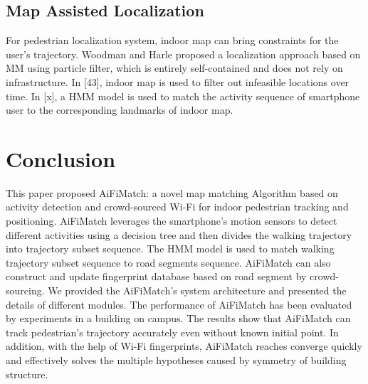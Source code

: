 \documentclass[conference]{IEEEtran}
\begin{document}
\subsection{Map Assisted Localization}
For pedestrian localization system, indoor map can bring constraints for the user's trajectory. Woodman and Harle proposed a localization approach based on MM using particle filter, which is entirely self-contained and does not rely on infrastructure. In [43], indoor map is used to filter out infeasible locations over time. In [x], a HMM model is used to match the activity sequence of smartphone user to the corresponding landmarks of indoor map.

\section{Conclusion}

This paper proposed AiFiMatch: a novel map matching Algorithm based on activity detection and crowd-sourced Wi-Fi for indoor pedestrian tracking and positioning. AiFiMatch leverages the smartphone's motion sensors to detect different activities using a decision tree and then divides the walking trajectory into trajectory subset sequence. The HMM model is used to match walking trajectory subset sequence to road segments sequence.  AiFiMatch can also construct and update fingerprint database based on road segment by crowd-sourcing. We provided the AiFiMatch's system architecture and presented the details of different modules. The performance of AiFiMatch has been evaluated by experiments in a building on campus. The results show that AiFiMatch can track pedestrian's trajectory accurately even without known initial point. In addition, with the help of Wi-Fi fingerprints, AiFiMatch reaches converge quickly and effectively solves the multiple hypotheses caused by symmetry of building structure. 

%
\end{document}
